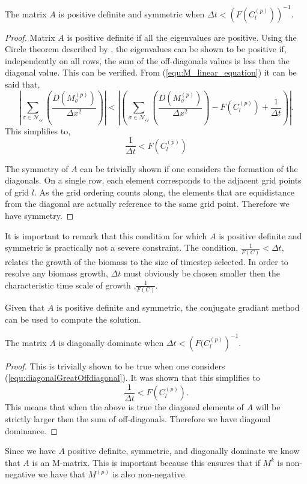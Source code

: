 \begin{prop}
  The matrix $A$ is positive definite and symmetric when $ \Delta t < \left( { F(C^{(p)}_{l}) } \right)^{-1}$.
\end{prop}
\begin{proof}
  Matrix $A$ is positive definite if all the eigenvalues are positive. 
  Using the Circle theorem described by \cite{varga2004gersgorin}, the eigenvalues can be shown to be positive if, independently on all rows, the sum of the off-diagonals values is less then the diagonal value.
  This can be verified. From (\ref{equ:M_linear_equation}) it can be said that,
  \begin{equation} \label{equ:diagonalGreatOffdiagonal}
    \left| \sum_{\sigma \in \mathcal{N_{ij}}} \left( \frac{D( M^{(p)}_{\sigma} )}{\Delta x^2} \right) \right|
     < \left| \left( \sum_{\sigma \in \mathcal{N_{ij}}} \left( \frac{D( M^{(p)}_{\sigma} )}{\Delta x^2} \right) 
    - F(C^{(p)}_{l}) + \frac{1}{\Delta t} \right) \right|.
  \end{equation}
  This simplifies to,
  \begin{equation}
    \frac{1}{\Delta t} < F(C^{(p)}_{l})
  \end{equation}

  The symmetry of $A$ can be trivially shown if one considers the formation of the diagonals.
  On a single row, each element corresponds to the adjacent grid points of grid $l$.
  As the grid ordering counts along, the elements that are equidistance from the diagonal are actually reference to the same grid point. 
  Therefore we have symmetry. 
\end{proof} 

It is important to remark that this condition for which $A$ is positive definite and symmetric is practically not a severe constraint.
The condition, $\frac{1}{F(C)} < \Delta t$, relates the growth of the biomass to the size of timestep selected.
In order to resolve any biomass growth, $\Delta t$ must obviously be chosen smaller then the characteristic time scale of growth ,$\frac{1}{F(C)}$.

Given that $A$ is positive definite and symmetric, the conjugate gradiant method can be used to compute the solution.

\begin{prop}
  The matrix $A$ is diagonally dominate when $\Delta t < \left( { F(C^{(p)}_{l}} \right)^{-1}$.
\end{prop}
\begin{proof}
  This is trivially shown to be true when one considers (\ref{equ:diagonalGreatOffdiagonal}).
  It was shown that this simplifies to 
  \begin{equation}
    \frac{1}{\Delta t} < F(C^{(p)}_{l}).
  \end{equation}
  This means that when the above is true the diagonal elements of $A$ will be strictly larger then the sum of off-diagonals.
  Therefore we have diagonal dominance.
\end{proof}
Since we have $A$ positive definite, symmetric, and diagonally dominate we know that $A$ is an M-matrix.
This is important because this ensures that if $M^k$ is non-negative we have that $M^{(p)}$ is also non-negative.

